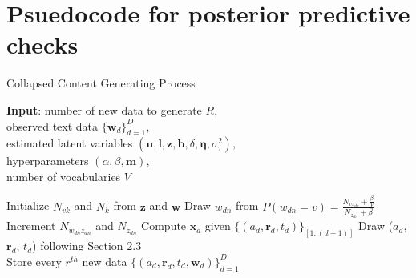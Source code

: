 \documentclass{article}
\begin{document}



\section{Psuedocode for posterior predictive checks} \label{sec: Pseudocode2}
\begin{algorithm}[H]
	\caption{Collapsed Content Generating Process}
	\begin{algorithmic}
		\STATE \textbf{Input}: number of new data to generate $R$,\\
		observed text data $ \{\boldsymbol{w}_d\}_{d=1}^D$,\\
		estimated latent variables $(\boldsymbol{u},  \boldsymbol{l},\boldsymbol{z}, \boldsymbol{b}, \delta, \boldsymbol{\eta},  \sigma_\tau^2),$\\
		hyperparameters $(\alpha, \beta, \boldsymbol{m})$,\\
		number of vocabularies $V$\\
		\vskip 0.1in
		
		\STATE Initialize $N_{vk}$ and $N_k$ from $\boldsymbol{z}$ and  $\boldsymbol{w}$  
		\STATE Draw	$w_{dn}$ from $P(w_{dn} = v)= \frac{N_{vz_{dn}} +\frac{\beta}{V}}{N_{z_{dn}} + \beta}$\\  			
		\STATE Increment $N_{w_{dn}z_{dn}}$ and $N_{z_{dn}}$ 		
		\ENDFOR
		\ENDIF
		\STATE  Compute $\boldsymbol{x}_{d}$ given $\{(a_{d}, \boldsymbol{r}_{d}, t_{d})\}_{[1:(d-1)]}$
		\STATE	Draw ($a_{d}$, $\boldsymbol{r}_{d}$, $t_{d}$) following Section 2.3\\
		\ENDFOR
		\STATE Store every $r^{th}$ new data $\{(a_{d}, \boldsymbol{r}_{d}, t_{d}, \boldsymbol{w}_{d})\}_{d=1}^D$ 
		\ENDFOR
	\end{algorithmic}
\end{algorithm}        

\end{document}

